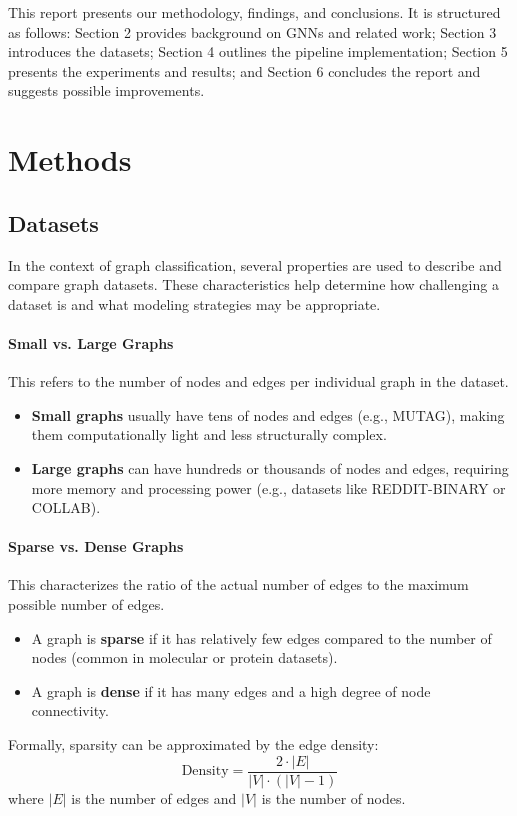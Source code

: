 \documentclass[11pt,a4paper]{article}
\begin{document}
	This report presents our methodology, findings, and conclusions. It is structured as follows: Section 2 provides background on GNNs and related work; Section 3 introduces the datasets; Section 4 outlines the pipeline implementation; Section 5 presents the experiments and results; and Section 6 concludes the report and suggests possible improvements.
	
	\section{Methods}
	
	\subsection{Datasets}
	In the context of graph classification, several properties are used to describe and compare graph datasets. These characteristics help determine how challenging a dataset is and what modeling strategies may be appropriate.
	
	\paragraph{Small vs. Large Graphs} 
	This refers to the number of nodes and edges per individual graph in the dataset. 
	\begin{itemize}
		\item \textbf{Small graphs} usually have tens of nodes and edges (e.g., MUTAG), making them computationally light and less structurally complex.
		\item \textbf{Large graphs} can have hundreds or thousands of nodes and edges, requiring more memory and processing power (e.g., datasets like REDDIT-BINARY or COLLAB).
	\end{itemize}
	
	\paragraph{Sparse vs. Dense Graphs} 
	This characterizes the ratio of the actual number of edges to the maximum possible number of edges.
	\begin{itemize}
		\item A graph is \textbf{sparse} if it has relatively few edges compared to the number of nodes (common in molecular or protein datasets).
		\item A graph is \textbf{dense} if it has many edges and a high degree of node connectivity.
	\end{itemize}
	Formally, sparsity can be approximated by the edge density:
	\[
	\text{Density} = \frac{2 \cdot |E|}{|V| \cdot (|V| - 1)}
	\]
	where $|E|$ is the number of edges and $|V|$ is the number of nodes.
	
\end{document}
